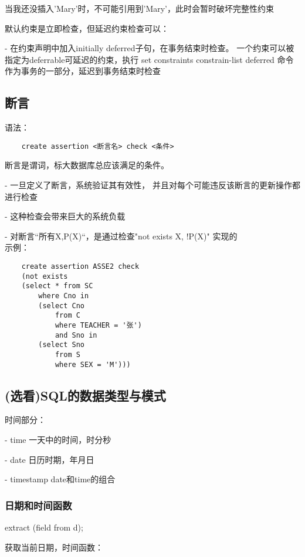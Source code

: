 \documentclass{article}        %
\begin{document}
当我还没插入'Mary'时，不可能引用到'Mary'，此时会暂时破坏完整性约束 

默认约束是立即检查，但延迟约束检查可以：

-  在约束声明中加入initially deferred子句，在事务结束时检查。
一个约束可以被指定为deferrable可延迟的约束，执行 set constraints constrain-list deferred 
命令作为事务的一部分，延迟到事务结束时检查

\subsection{断言}

语法：

\begin{verbatim}
    create assertion <断言名> check <条件> 
\end{verbatim}

断言是谓词，标大数据库总应该满足的条件。

- 一旦定义了断言，系统验证其有效性，
并且对每个可能违反该断言的更新操作都进行检查

- 这种检查会带来巨大的系统负载

- 对断言“所有X,P(X)“，是通过检查"not exists X, !P(X)" 实现的 \\ 

示例：

\begin{verbatim}
    create assertion ASSE2 check 
    (not exists 
    (select * from SC 
        where Cno in 
        (select Cno
            from C 
            where TEACHER = '张')
            and Sno in 
        (select Sno 
            from S 
            where SEX = 'M')))
\end{verbatim}

\subsection{(选看)SQL的数据类型与模式}

时间部分：

- time 一天中的时间，时分秒

- date 日历时期，年月日

- timestamp date和time的组合 

\subsubsection{日期和时间函数}

    extract (field from d);

获取当前日期，时间函数：
\end{document}
